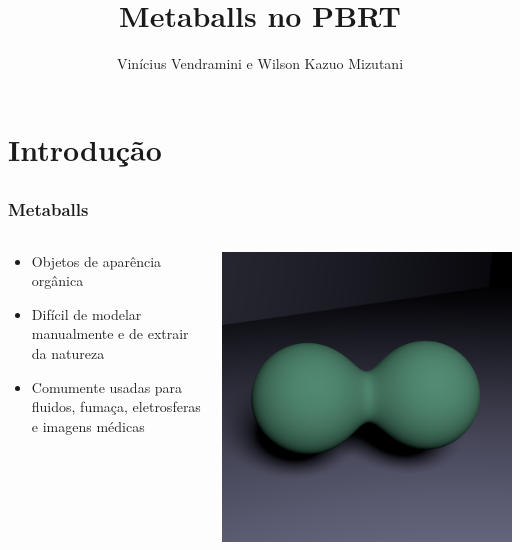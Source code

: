 \documentclass[brazil]{beamer}
\begin{document}
  \title{Metaballs no PBRT}
  \author{Vinícius Vendramini e Wilson Kazuo Mizutani}

  \frame{
    \titlepage
  }
  
  \section{Introdução}
  
    \subsection{}
    \begin{frame}
      \frametitle{Metaballs}
      \begin{columns}
        \begin{column}{0.58\textwidth}
          \begin{itemize}
            \item Objetos de aparência orgânica
            \item Difícil de modelar manualmente e de extrair da natureza
            \item Comumente usadas para fluidos, fumaça, eletrosferas e imagens médicas
          \end{itemize}
        \end{column}
        \begin{column}{0.4\textwidth}
          \begin{center}
            \includegraphics[width=1.0\textwidth]{imgs/metaball-good1.png}
          \end{center}
        \end{column}
      \end{columns}
    \end{frame}
\end{document}
